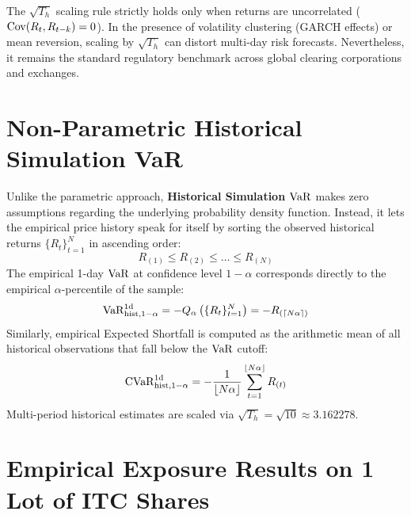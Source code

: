 \begin{remarkbox}
The $\sqrt{T_h}$ scaling rule strictly holds only when returns are uncorrelated ($\operatorname{Cov}(R_t, R_{t-k}) = 0$). In the presence of volatility clustering (GARCH effects) or mean reversion, scaling by $\sqrt{T_h}$ can distort multi-day risk forecasts. Nevertheless, it remains the standard regulatory benchmark across global clearing corporations and exchanges.
\end{remarkbox}

\section{Non-Parametric Historical Simulation VaR}
\label{sec:historical_var}

Unlike the parametric approach, \textbf{Historical Simulation $\operatorname{VaR}$} makes zero assumptions regarding the underlying probability density function. Instead, it lets the empirical price history speak for itself by sorting the observed historical returns $\{R_t\}_{t=1}^N$ in ascending order:
\begin{equation}
R_{(1)} \le R_{(2)} \le \dots \le R_{(N)}
\end{equation}
The empirical 1-day $\operatorname{VaR}$ at confidence level $1 - \alpha$ corresponds directly to the empirical $\alpha$-percentile of the sample:
\begin{equation}
\operatorname{VaR}_{\text{hist}, 1-\alpha}^{1\text{d}} = - Q_{\alpha}\left(\{R_t\}_{t=1}^N\right) = - R_{(\lceil N \alpha \rceil)}
\label{eq:historical_var}
\end{equation}
Similarly, empirical Expected Shortfall is computed as the arithmetic mean of all historical observations that fall below the $\operatorname{VaR}$ cutoff:
\begin{equation}
\operatorname{CVaR}_{\text{hist}, 1-\alpha}^{1\text{d}} = - \frac{1}{\lfloor N \alpha \rfloor} \sum_{t=1}^{\lfloor N \alpha \rfloor} R_{(t)}
\label{eq:historical_cvar}
\end{equation}
Multi-period historical estimates are scaled via $\sqrt{T_h} = \sqrt{10} \approx 3.162278$.

\section{Empirical Exposure Results on 1 Lot of ITC Shares}
\label{sec:empirical_var_results}

